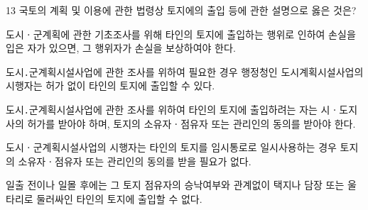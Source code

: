 \begin{question}{13}
국토의 계획 및 이용에 관한 법령상 토지에의 출입 등에 관한 설명으로 옳은 것은?
\begin{choices}
  \item 도시ㆍ군계획에 관한 기초조사를 위해 타인의 토지에 출입하는 행위로 인하여 손실을 입은 자가 있으면, 그 행위자가 손실을 보상하여야 한다.
  \item 도시․군계획시설사업에 관한 조사를 위하여 필요한 경우 행정청인 도시계획시설사업의 시행자는 허가 없이 타인의 토지에 출입할 수 있다.
  \item 도시․군계획시설사업에 관한 조사를 위하여 타인의 토지에 출입하려는 자는 시ㆍ도지사의 허가를 받아야 하며, 토지의 소유자ㆍ점유자 또는 관리인의 동의를 받아야 한다.
  \item 도시ㆍ군계획시설사업의 시행자는 타인의 토지를 임시통로로 일시사용하는 경우 토지의 소유자ㆍ점유자 또는 관리인의 동의를 받을 필요가 없다.
  \item 일출 전이나 일몰 후에는 그 토지 점유자의 승낙여부와 관계없이 택지나 담장 또는 울타리로 둘러싸인 타인의 토지에 출입할 수 없다.
\end{choices}
\end{question}
